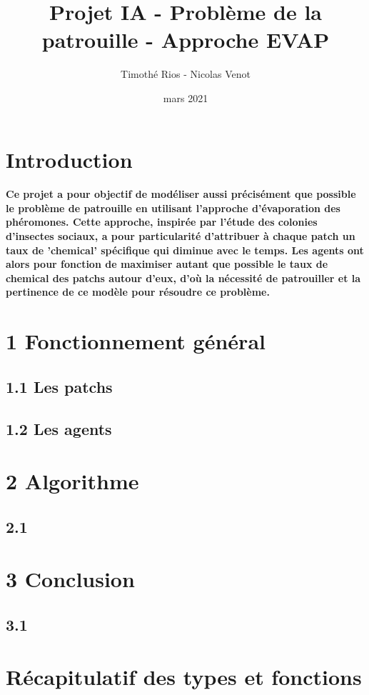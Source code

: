 \documentclass{article}
\title{Projet IA - Problème de la patrouille - Approche EVAP}
\author{Timoth\'e Rios - Nicolas Venot}
\date{mars 2021}
\begin{document}
\maketitle
\newpage
\tableofcontents
\newpage
\setlength{\parindent}{0pt}
\section*{Introduction}
\paragraph{Ce projet a pour objectif de modéliser aussi précisément que possible le problème de patrouille en utilisant l'approche d'évaporation des phéromones.
Cette approche, inspirée par l'étude des colonies d'insectes sociaux, a pour particularité d'attribuer à chaque patch un taux de 'chemical' spécifique qui diminue avec le temps.
Les agents ont alors pour fonction de maximiser autant que possible le taux de chemical des patchs autour d'eux, d'où la nécessité de patrouiller et la pertinence de ce modèle pour résoudre ce problème.}
\section{1 Fonctionnement général}
    \subsection{1.1 Les patchs}

      
    \subsection{1.2 Les agents}
        
\section{2 Algorithme}
    \subsection{2.1}
\section{3 Conclusion}
    \subsection{3.1}

\appendix
\newpage
\section{R\'ecapitulatif des types et fonctions}


    
\end{document}

